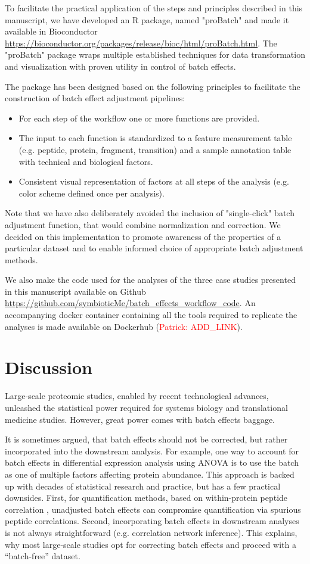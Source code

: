 \documentclass[num-refs]{wiley-article}
\begin{document}
To facilitate the practical application of the steps and principles described in this manuscript, we have developed an R package, named "proBatch" and made it available in Bioconductor \url{https://bioconductor.org/packages/release/bioc/html/proBatch.html}. The "proBatch" package wraps multiple established techniques for data transformation and visualization with proven utility in control of batch effects. 

The package has been designed based on the following principles to facilitate the construction of batch effect adjustment pipelines:
\begin{itemize}
    \item For each step of the workflow one or more functions are provided.
    \item The input to each function is standardized to a feature measurement table (e.g. peptide, protein, fragment, transition) and a sample annotation table with technical and biological factors.
    \item Consistent visual representation of factors at all steps of the analysis (e.g. color scheme defined once per analysis).
\end{itemize}

Note that we have also deliberately avoided the inclusion of "single-click" batch adjustment function, that would combine normalization and correction. We decided on this implementation to promote awareness of the properties of a particular dataset and to enable informed choice of appropriate batch adjustment methods.

We also make the code used for the analyses of the three case studies presented in this manuscript available on Github \url{https://github.com/symbioticMe/batch\_effects\_workflow\_code}. An accompanying docker container containing all the tools required to replicate the analyses is made available on Dockerhub (\textcolor{red}{Patrick: ADD\_LINK}).

\section{Discussion}

Large-scale proteomic studies, enabled by recent technological advances, unleashed the statistical power required for systems biology and translational medicine studies. However, great power comes with batch effects baggage. 

It is sometimes argued, that batch effects should not be corrected, but rather incorporated into the downstream analysis. For example, one way to account for batch effects in differential expression analysis using ANOVA is to use the batch as one of multiple factors affecting protein abundance. This approach is backed up with decades of statistical research and practice, but has a few practical downsides. First, for quantification methods, based on within-protein peptide correlation \cite{Teo:2015aa}, unadjusted batch effects can compromise quantification via spurious peptide correlations. Second, incorporating batch effects in downstream analyses is not always straightforward (e.g. correlation network inference). This explains, why most large-scale studies opt for correcting batch effects and proceed with a “batch-free” dataset.
\end{document}
